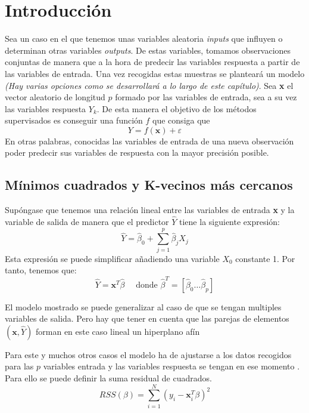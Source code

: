 \section{Introducción}
\noindent Sea un caso en el que tenemos unas variables aleatoria \textit{inputs} que influyen o determinan otras variables \textit{outputs}. De estas variables, tomamos observaciones conjuntas de manera que a la hora de predecir las variables respuesta a partir de las variables de entrada. Una vez recogidas estas muestras se planteará un modelo \textit{(Hay varias opciones como se desarrollará a lo largo de este capítulo)}.
\noindent Sea \textbf{x} el vector aleatorio de longitud $p$ formado por las variables de entrada, sea a su vez las variables respuesta $Y_k$. De esta manera el objetivo de los métodos supervisados es conseguir una función $f$ que consiga que \begin{equation}
Y=f(\textbf{x})+\varepsilon
\end{equation}
En otras palabras, conocidas las variables de entrada de una nueva observación poder predecir sus variables de respuesta con la mayor precisión posible. 
\subsection{Mínimos cuadrados y K-vecinos más cercanos}
\noindent Supóngase que tenemos una relación lineal entre las variables de entrada \textbf{x} y la variable de salida de manera que el predictor $\hat{Y}$ tiene la siguiente expresión:
\begin{equation}
\hat{Y}=\hat{\beta}_0+\sum_{j=1}^p \hat{\beta}_j X_j
\end{equation}
\noindent Esta expresión se puede simplificar añadiendo una variable $X_0$ constante 1. Por tanto, tenemos que:
\begin{equation}
\hat{Y}=\textbf{x}^T\hat{\beta}\quad \text{ donde } \hat{\beta}^T=[\hat{\beta}_0\ldots \hat{\beta}_p ]
\end{equation}

\noindent El modelo mostrado se puede generalizar al caso de que se tengan multiples variables de salida. Pero hay que tener en cuenta que las parejas de elementos $(\textbf{x},\hat{Y})$ forman en este caso lineal un hiperplano afín

\noindent Para este y muchos otros casos el modelo ha de ajustarse a los datos recogidos para las $p$ variables entrada y las variables respuesta se tengan en ese momento . Para ello se puede definir la suma residual de cuadrados. 
\begin{equation}
RSS(\beta)=\sum_{i=1}^N(y_i-\textbf{x}_i^T\beta)^2 
\end{equation} 

